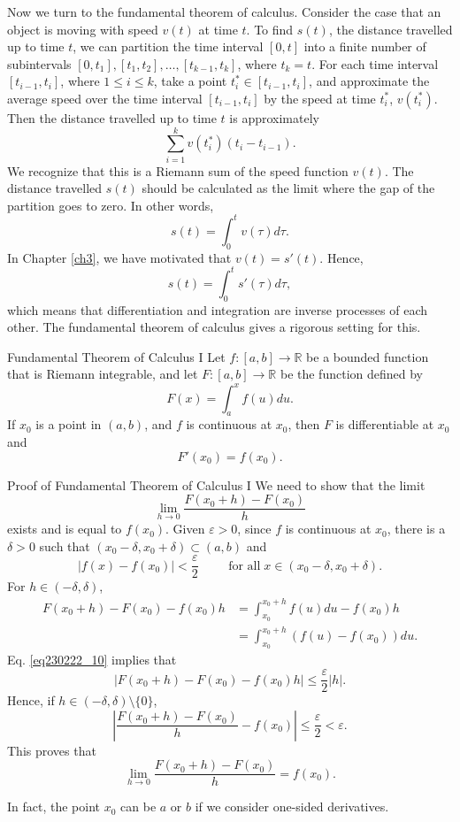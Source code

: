 Now we turn to the fundamental theorem of calculus. Consider the case that an object is moving with speed $v(t)$ at time $t$. To find $s(t)$, the distance  travelled up to time $t$, we can partition the time interval $[0, t]$ into a finite number of subintervals $[0, t_1], [t_1, t_2], \ldots, [t_{k-1}, t_k]$, where $t_k=t$. For each time interval $[t_{i-1}, t_i]$, where $1\leq i\leq k$, take a point $t_i^*\in [t_{i-1}, t_i]$, and approximate the average speed over the time interval $[t_{i-1}, t_i]$ by the speed at time $t_i^*$, $v(t_i^*)$. Then the distance travelled up to time $t$ is approximately 
\[\sum_{i=1}^k v(t_i^*)(t_i-t_{i-1}).\]
We recognize that this is  a Riemann sum of the speed function $v(t)$. The distance travelled $s(t)$ should be calculated as the limit where the gap of the partition goes to zero. In other words,
\[s(t)=\int_0^t v(\tau)d\tau.\]In Chapter \ref{ch3}, we have motivated that $v(t)=s'(t)$. Hence, 
\[s(t)=\int_0^ts'(\tau)d\tau,\]which means that differentiation and integration are inverse processes of each other. The fundamental theorem of calculus gives a rigorous setting for this.
\begin{theorem}{Fundamental Theorem of Calculus I}
Let $f:[a,b]\to\mathbb{R}$ be a bounded function that is Riemann integrable, and let $F:[a,b]\to\mathbb{R}$ be the function defined by
\[F(x)=\int_a^xf(u)du.\]
If $x_0$ is a point in $ (a,b)$, and $f$ is continuous at $x_0$, then $F$ is differentiable at $x_0$ and
\[F'(x_0)=f(x_0).\]
\end{theorem}
 
\begin{myproof}{Proof of Fundamental Theorem of Calculus I}
We need to show that the limit
\[\lim_{h\to 0}\frac{F(x_0+h)-F(x_0)}{h}\] exists and is equal to $f(x_0)$. Given $\varepsilon>0$, since $f$ is continuous at $x_0$, there is a $\delta>0$ such that $(x_0-\delta,x_0+\delta)\subset (a,b)$ and 
\begin{equation}\label{eq230222_10}\left|f(x)-f(x_0)\right|<\frac{\varepsilon}{2}\hspace{1cm}\text{for all}\; x\in (x_0-\delta, x_0+\delta).\end{equation}
\bp
For $h\in (-\delta, \delta)$,
\begin{align*}
F(x_0+h)-F(x_0)-f(x_0)h&=\int_{x_0}^{x_0+h}f(u)du-f(x_0)h\\&=\int_{x_0}^{x_0+h}\left(f(u)-f(x_0)\right)du.\end{align*}
Eq. \eqref{eq230222_10} implies that
\[\left|F(x_0+h)-F(x_0)-f(x_0)h\right|\leq\frac{\varepsilon}{2}|h|.\]
Hence, if $h\in (-\delta, \delta)\setminus\{0\}$, 
\[\left|\frac{F(x_0+h)-F(x_0)}{h}-f(x_0) \right|\leq\frac{\varepsilon}{2}<\varepsilon.\]
This proves that
\[\lim_{h\to 0}\frac{F(x_0+h)-F(x_0)}{h}=f(x_0).\]
\end{myproof}
In fact, the point $x_0$ can be $a$ or $b$ if we consider one-sided derivatives.


